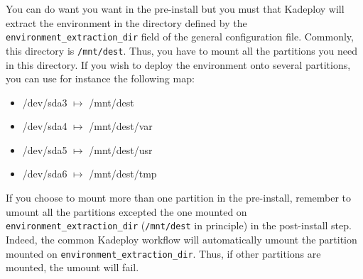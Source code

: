 \documentclass[a4wide,10pt,oneside]{book}
\begin{document}
You can do want you want in the pre-install but you must that Kadeploy will extract the environment in the directory defined by the \texttt{environment\_extraction\_dir} field of the general configuration file. Commonly, this directory is \texttt{/mnt/dest}. Thus, you have to mount all the partitions you need in this directory. If you wish to deploy the environment onto several partitions, you can use for instance the following map:
\begin{itemize}
\item /dev/sda3 $\mapsto$ /mnt/dest
\item /dev/sda4 $\mapsto$ /mnt/dest/var
\item /dev/sda5 $\mapsto$ /mnt/dest/usr
\item /dev/sda6 $\mapsto$ /mnt/dest/tmp
\end{itemize}

If you choose to mount more than one partition in the pre-install, remember to umount all the partitions excepted the one mounted on \texttt{environment\_extraction\_dir} (\texttt{/mnt/dest} in principle) in the post-install step. Indeed, the common Kadeploy workflow will automatically umount the partition mounted on \texttt{environment\_extraction\_dir}. Thus, if other partitions are mounted, the umount will fail.
\end{document}
